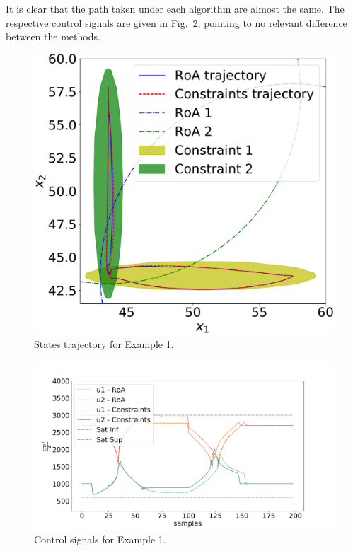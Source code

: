 It is clear that the path taken under each algorithm are almost the same. The
respective control signals are given in Fig.~\ref{fig:control-signals}, pointing
to no relevant difference between the methods.

\begin{figure}[ht!]
  \centering
  \captionsetup{justification=centering}
  \includegraphics[width=0.9\linewidth]{imgs/tanks-states}
  \caption{States trajectory for Example 1.}%
  \label{fig:states}
\end{figure}

\begin{figure}[ht!]
  \centering
  \captionsetup{justification=centering}
  \includegraphics[width=\linewidth]{imgs/tanks-control-signal}
  \caption{Control signals for Example 1.}%
  \label{fig:control-signals}
\end{figure}

